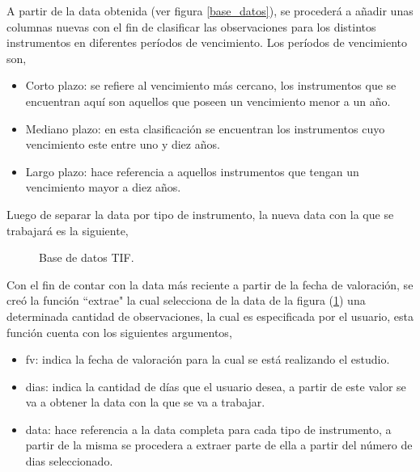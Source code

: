 \hspace{0.4cm} A partir de la data obtenida (ver figura \ref{base_datos}), se proceder\'a a a\~nadir unas columnas nuevas con el fin de clasificar las observaciones para los distintos instrumentos en diferentes per\'iodos de vencimiento. Los per\'iodos de vencimiento son,

\begin{itemize}
\item Corto plazo: se refiere al vencimiento m\'as cercano, los instrumentos que se encuentran aqu\'i son aquellos que poseen un vencimiento menor a un a\~no.
\item Mediano plazo: en esta clasificaci\'on se encuentran los instrumentos cuyo vencimiento este entre uno y diez a\~nos.
\item Largo plazo: hace referencia a aquellos instrumentos que tengan un vencimiento mayor a diez a\~nos.
\end{itemize}

\hspace{0.4cm} Luego de separar la data por tipo de instrumento, la nueva data con la que se trabajar\'a es la siguiente,

\begin{figure}[h]
\caption{Base de datos TIF.}
\label{base_datos_tif}
\end{figure}

\hspace{0.4cm} Con el fin de contar con la data m\'as reciente a partir de la fecha de valoraci\'on, se cre\'o la funci\'on ``extrae" \hspace{0.01cm} la cual selecciona de la data de la figura (\ref{base_datos_tif}) una determinada cantidad de observaciones, la cual es especificada por el usuario, esta funci\'on cuenta con los siguientes argumentos,

\begin{itemize}
 \item fv: indica la fecha de valoraci\'on para la cual se est\'a realizando el estudio.
 \item dias: indica la cantidad de d\'ias que el usuario desea, a partir de este valor se va a obtener la data con la que se va a trabajar.
 \item data: hace referencia a la data completa para cada tipo de instrumento, a partir de la misma se procedera a extraer parte de ella a partir del n\'umero de dias seleccionado.
\end{itemize}

